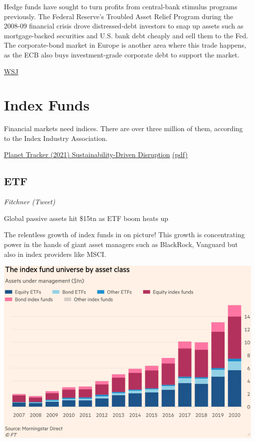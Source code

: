 \documentclass[
]{book}
\begin{document}
Hedge funds have sought to turn profits from central-bank stimulus programs previously. The Federal Reserve's Troubled Asset Relief Program during the 2008-09 financial crisis drove distressed-debt investors to snap up assets such as mortgage-backed securities and U.S. bank debt cheaply and sell them to the Fed. The corporate-bond market in Europe is another area where this trade happens, as the ECB also buys investment-grade corporate debt to support the market.

\href{https://www.wsj.com/articles/hedge-funds-face-backlash-from-europe-in-bond-market-11620639114}{WSJ}

\hypertarget{index-funds}{%
\chapter{Index Funds}\label{index-funds}}

Financial markets need indices. There are over three million of
them, according to the Index Industry Association.

\href{https://planet-tracker.org/tracker-programmes/cross-programme-papers/\#indexing-prepare-for-sustainability-driven-disruption}{Planet Tracker (2021) Sustainability-Driven Disruption}
\href{pdf/Planettracker_2021_Indexing.pdf}{(pdf)}

\hypertarget{etf}{%
\section{ETF}\label{etf}}

\emph{Fitchner (Tweet)}

Global passive assets hit \$15tn as ETF boom heats up

The relentless growth of index funds in on picture!
This growth is concentrating power in the hands of
giant asset managers such as BlackRock, Vanguard
but also in index providers like MSCI.

\includegraphics{fig/ft_index_funds_2007-2020.png}
\end{document}
